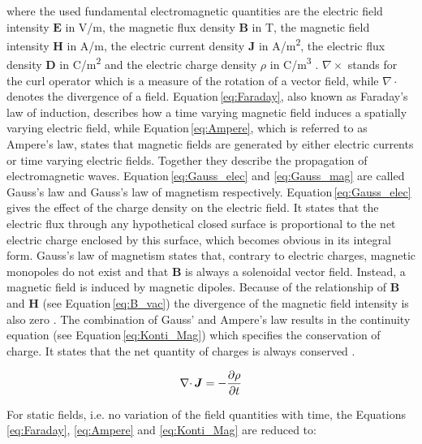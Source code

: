 where the used fundamental electromagnetic quantities are the electric field intensity $\boldsymbol{E}$ in V/m, the magnetic flux density $\boldsymbol{B}$ in T, the magnetic field intensity $\boldsymbol{H}$ in A/m, the electric current density $\boldsymbol{J}$ in A/m\textsuperscript{2}, the electric flux density $\boldsymbol{D}$ in C/m\textsuperscript{2} and the electric charge density $\rho$ in C/m\textsuperscript{3} \cite{meschede2015gerthsen,monk2003finite}. $\nabla\times$ stands for the curl operator which is a measure of the rotation of a vector field, while $\nabla\cdotp$ denotes the divergence of a field. Equation\,\ref{eq:Faraday}, also known as Faraday's law of induction, describes how a time varying magnetic field induces a spatially varying electric field, while Equation\,\ref{eq:Ampere}, which is referred to as Ampere's law, states that magnetic fields are generated by either electric currents or time varying electric fields. Together they describe the propagation of electromagnetic waves. Equation\,\ref{eq:Gauss_elec} and \ref{eq:Gauss_mag} are called Gauss's law and Gauss's law of magnetism respectively. Equation\,\ref{eq:Gauss_elec} gives the effect of the charge density on the electric field. It states that the electric flux through any hypothetical closed surface is proportional to the net electric charge enclosed by this surface, which becomes obvious in its integral form. Gauss's law of magnetism states that, contrary to electric charges, magnetic monopoles do not exist and that $\boldsymbol{B}$ is always a solenoidal vector field. Instead, a magnetic field is induced by magnetic dipoles. Because of the relationship of $\boldsymbol{B}$ and $\boldsymbol{H}$ (see Equation\,\ref{eq:B_vac}) the divergence of the magnetic field intensity is also zero \cite{monk2003finite,kallenbach2018elektromagnete}.
The combination of Gauss' and Ampere's law results in the continuity equation (see Equation\,\ref{eq:Konti_Mag}) which specifies the conservation of charge. It states that the net quantity of charges is always conserved \cite{monk2003finite,meschede2015gerthsen,schwab2013begriffswelt}.   

\begin{equation}
\label{eq:Konti_Mag}
\centering
\nabla\cdotp\boldsymbol{J} = -\frac{\partial\rho}{\partial t}
\end{equation}

For static fields, i.e. no variation of the field quantities with time, the Equations \ref{eq:Faraday}, \ref{eq:Ampere} and \ref{eq:Konti_Mag} are reduced to:


